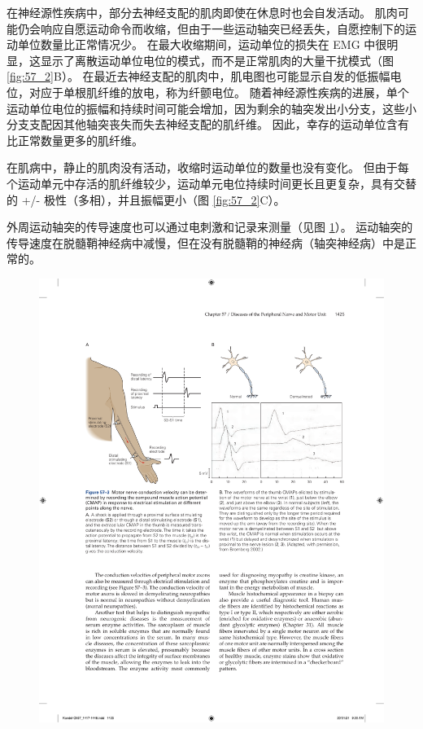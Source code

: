 在神经源性疾病中，部分去神经支配的肌肉即使在休息时也会自发活动。 肌肉可能仍会响应自愿运动命令而收缩，但由于一些运动轴突已经丢失，自愿控制下的运动单位数量比正常情况少。 在最大收缩期间，运动单位的损失在 EMG 中很明显，这显示了离散运动单位电位的模式，而不是正常肌肉的大量干扰模式（图 \ref{fig:57_2}B）。 在最近去神经支配的肌肉中，肌电图也可能显示自发的低振幅电位，对应于单根肌纤维的放电，称为纤颤电位。 随着神经源性疾病的进展，单个运动单位电位的振幅和持续时间可能会增加，因为剩余的轴突发出小分支，这些小分支支配因其他轴突丧失而失去神经支配的肌纤维。 因此，幸存的运动单位含有比正常数量更多的肌纤维。

在肌病中，静止的肌肉没有活动，收缩时运动单位的数量也没有变化。 但由于每个运动单元中存活的肌纤维较少，运动单元电位持续时间更长且更复杂，具有交替的 +/- 极性（多相），并且振幅更小（图 \ref{fig:57_2}C）。

外周运动轴突的传导速度也可以通过电刺激和记录来测量（见图 \ref{fig:57_3}）。 运动轴突的传导速度在脱髓鞘神经病中减慢，但在没有脱髓鞘的神经病（轴突神经病）中是正常的。

\begin{figure}[htbp]
	\centering
	\includegraphics[width=0.95\linewidth]{chap57/fig_57_3}
	\caption{}
	\label{fig:57_3}
\end{figure}

